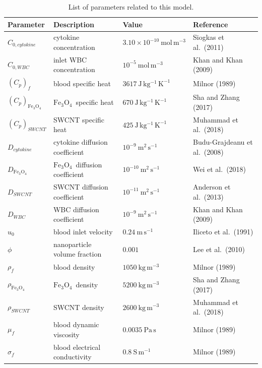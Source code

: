 \documentclass[10pt]{NSP1}
\def\feo{\ensuremath{\mathrm{Fe}_3\mathrm{O}_4}}
\begin{document}
	\begin{table}[!t]
		\centering
		\caption{List of parameters related to this model.}
		\label{tab:params}
		\small
		\renewcommand{\arraystretch}{1.12}
		\begin{tabular}{p{2.8cm}p{5.8cm}p{3.8cm}p{4.2cm}}
			\hline
			\textbf{Parameter} & \textbf{Description} & \textbf{Value} & \textbf{Reference}\\
			\hline
			$C_{0,cytokine}$ & cytokine concentration & $3.10\times10^{-10}\ \mathrm{mol\,m^{-3}}$ & Siogkas et al.\ (2011)\\
			$C_{0,WBC}$ & inlet WBC concentration & $10^{-5}\ \mathrm{mol\,m^{-3}}$ & Khan and Khan (2009)\\
			$\left(C_p\right)_f$ & blood specific heat & $3617\ \mathrm{J\,kg^{-1}\,K^{-1}}$ & Milnor (1989)\\
			$\left(C_p\right)_{\feo}$ & \feo\ specific heat & $670\ \mathrm{J\,kg^{-1}\,K^{-1}}$ & Sha and Zhang (2017)\\
			$\left(C_p\right)_{SWCNT}$ & SWCNT specific heat & $425\ \mathrm{J\,kg^{-1}\,K^{-1}}$ & Muhammad et al.\ (2018)\\
			$D_{cytokine}$ & cytokine diffusion coefficient & $10^{-9}\ \mathrm{m^{2}\,s^{-1}}$ & Budu-Grajdeanu et al.\ (2008)\\
			$D_{\feo}$ & \feo\ diffusion coefficient & $10^{-10}\ \mathrm{m^{2}\,s^{-1}}$ & Wei et al.\ (2018)\\
			$D_{SWCNT}$ & SWCNT diffusion coefficient & $10^{-11}\ \mathrm{m^{2}\,s^{-1}}$ & Anderson et al.\ (2013)\\
			$D_{WBC}$ & WBC diffusion coefficient & $10^{-9}\ \mathrm{m^{2}\,s^{-1}}$ & Khan and Khan (2009)\\
			$u_0$ & blood inlet velocity & $0.24\ \mathrm{m\,s^{-1}}$ & Iliceto et al.\ (1991)\\
			$\phi$ & nanoparticle volume fraction & $0.001$ & Lee et al.\ (2010)\\
			$\rho_f$ & blood density & $1050\ \mathrm{kg\,m^{-3}}$ & Milnor (1989)\\
			$\rho_{\feo}$ & \feo\ density & $5200\ \mathrm{kg\,m^{-3}}$ & Sha and Zhang (2017)\\
			$\rho_{SWCNT}$ & SWCNT density & $2600\ \mathrm{kg\,m^{-3}}$ & Muhammad et al.\ (2018)\\
			$\mu_f$ & blood dynamic viscosity & $0.0035\ \mathrm{Pa\,s}$ & Milnor (1989)\\
			$\sigma_f$ & blood electrical conductivity & $0.8\ \mathrm{S\,m^{-1}}$ & Milnor (1989)\\

\end{tabular}
\end{table}
\end{document}
